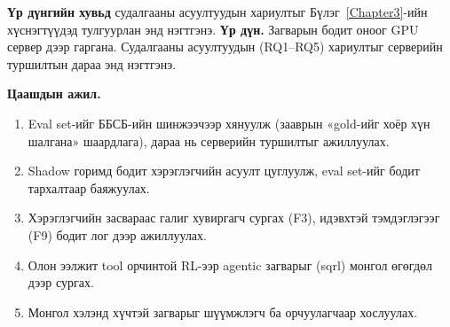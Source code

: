 \ifnum{}
\textbf{Үр дүнгийн хувьд} судалгааны асуултуудын хариултыг Бүлэг~\ref{Chapter3}-ийн хүснэгтүүдэд тулгуурлан энд
нэгтгэнэ. %
\else
\textbf{Үр дүн.} Загварын бодит оноог GPU сервер дээр гаргана. Судалгааны асуултуудын (RQ1--RQ5) хариултыг
серверийн туршилтын дараа энд нэгтгэнэ. %
\fi

\textbf{Цаашдын ажил.}
\begin{enumerate}
  \item Eval set-ийг ББСБ-ийн шинжээчээр хянуулж (зааврын «gold-ийг хоёр хүн шалгана» шаардлага), дараа нь серверийн
        туршилтыг ажиллуулах.
  \item Shadow горимд бодит хэрэглэгчийн асуулт цуглуулж, eval set-ийг бодит тархалтаар баяжуулах.
  \item Хэрэглэгчийн засвараас галиг хувиргагч сургах (F3), идэвхтэй тэмдэглэгээг (F9) бодит лог дээр ажиллуулах.
  \item Олон ээлжит tool орчинтой RL-ээр agentic загварыг (sqrl) монгол өгөгдөл дээр сургах.
  \item Монгол хэлэнд хүчтэй загварыг шүүмжлэгч ба орчуулагчаар хослуулах.
\end{enumerate}

